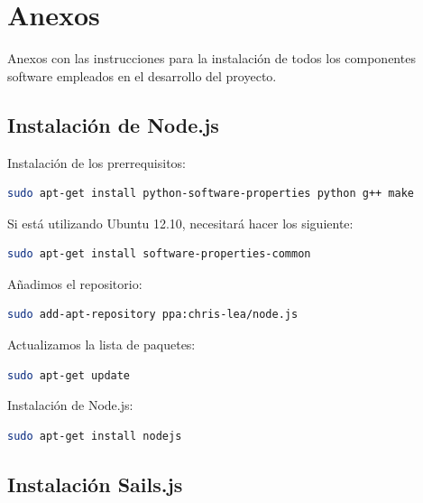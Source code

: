 

\newpage


\chapter{Anexos}
\label{chap:anexos}

Anexos con las instrucciones para la instalación de todos los componentes software empleados en el desarrollo del proyecto.

\section{Instalación de Node.js}


Instalación de los prerrequisitos:

\begin{lstlisting}[language=bash]
sudo apt-get install python-software-properties python g++ make
\end{lstlisting}


Si está utilizando Ubuntu 12.10, necesitará hacer los siguiente:

\begin{lstlisting}[language=bash]
sudo apt-get install software-properties-common
\end{lstlisting}


Añadimos el repositorio:

\begin{lstlisting}[language=bash]
sudo add-apt-repository ppa:chris-lea/node.js
\end{lstlisting}

Actualizamos la lista de paquetes:

\begin{lstlisting}[language=bash]
sudo apt-get update
\end{lstlisting}

Instalación de  Node.js:

\begin{lstlisting}[language=bash]
sudo apt-get install nodejs
\end{lstlisting}




\section{Instalación Sails.js}

